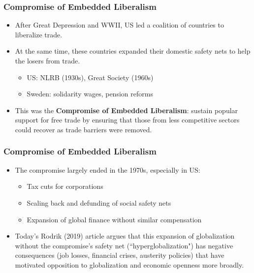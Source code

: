 \documentclass[handout]{beamer}
\begin{document}
\begin{frame} 
	\frametitle{\LARGE Compromise of Embedded Liberalism}
	\begin{itemize}
			\item After Great Depression and WWII, US led a coalition of countries to liberalize trade. \pause 
			\item At the same time, these countries expanded their domestic safety nets to help the losers from trade. \pause 
			\begin{itemize}
				\item US: NLRB (1930s), Great Society (1960s) \pause
				\item Sweden: solidarity wages, pension reforms \pause 
			\end{itemize}
		\item This was the \textbf{Compromise of Embedded Liberalism}: sustain popular support for free trade by ensuring that those from less competitive sectors could recover as trade barriers were removed.
	\end{itemize}
\end{frame}

\begin{frame} 
	\frametitle{\LARGE Compromise of Embedded Liberalism}
	\begin{itemize}
		\item The compromise largely ended in the 1970s, especially in US: \pause 
		\begin{itemize}
			\item Tax cuts for corporations \pause 
			\item Scaling back and defunding of social safety nets \pause
			\item Expansion of global finance without similar compensation \pause
		\end{itemize}
		\item Today's Rodrik (2019) article argues that this expansion of globalization without the compromise's safety net (``hyperglobalization") has negative consequences (job losses, financial crises, austerity policies) that have motivated opposition to globalization and economic openness more broadly.
	\end{itemize}
\end{frame}
\end{document}
